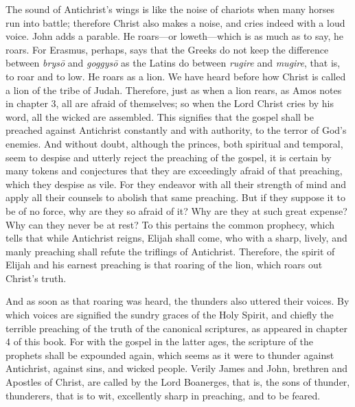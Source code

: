 The sound of Antichrist’s wings is like the noise of chariots when many horses run into battle; therefore Christ also makes a noise, and cries indeed with a loud voice. John adds a parable. He roars—or loweth—which is as much as to say, he roars. For Erasmus, perhaps, says that the Greeks do not keep the difference between \textit{brysō} and \textit{goggysō} as the Latins do between \textit{rugire} and \textit{mugire}, that is, to roar and to low. He roars as a lion. We have heard before how Christ is called a lion of the tribe of Judah. Therefore, just as when a lion rears, as Amos notes in chapter 3, all are afraid of themselves; so when the Lord Christ cries by his word, all the wicked are assembled. This signifies that the gospel shall be preached against Antichrist constantly and with authority, to the terror of God’s enemies. And without doubt, although the princes, both spiritual and temporal, seem to despise and utterly reject the preaching of the gospel, it is certain by many tokens and conjectures that they are exceedingly afraid of that preaching, which they despise as vile. For they endeavor with all their strength of mind and apply all their counsels to abolish that same preaching. But if they suppose it to be of no force, why are they so afraid of it? Why are they at such great expense? Why can they never be at rest? To this pertains the common prophecy, which tells that while Antichrist reigns, Elijah shall come, who with a sharp, lively, and manly preaching shall refute the triflings of Antichrist. Therefore, the spirit of Elijah and his earnest preaching is that roaring of the lion, which roars out Christ’s truth.

And as soon as that roaring was heard, the thunders also uttered their voices. By which voices are signified the sundry graces of the Holy Spirit, and chiefly the terrible preaching of the truth of the canonical scriptures, as appeared in chapter 4 of this book. For with the gospel in the latter ages, the scripture of the prophets shall be expounded again, which seems as it were to thunder against Antichrist, against sins, and wicked people. Verily James and John, brethren and Apostles of Christ, are called by the Lord Boanerges, that is, the sons of thunder, thunderers, that is to wit, excellently sharp in preaching, and to be feared.

